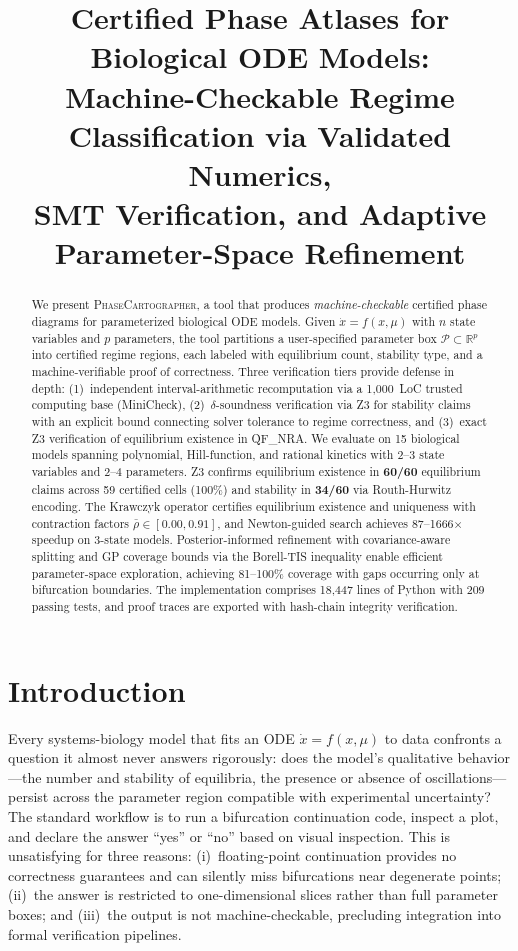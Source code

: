 \documentclass[11pt]{article}
\title{Certified Phase Atlases for Biological ODE Models:\\
Machine-Checkable Regime Classification via Validated Numerics,\\
SMT Verification, and Adaptive Parameter-Space Refinement}
\date{}
\newcommand{\R}{\mathbb{R}}
\newcommand{\PC}{\textsc{PhaseCartographer}}
\begin{document}
\maketitle

\begin{abstract}
We present \PC{}, a tool that produces \emph{machine-checkable} certified phase diagrams for parameterized biological ODE models.
Given $\dot{x} = f(x, \mu)$ with $n$ state variables and $p$ parameters, the tool partitions a user-specified parameter box $\mathcal{P} \subset \R^p$ into certified regime regions, each labeled with equilibrium count, stability type, and a machine-verifiable proof of correctness.
Three verification tiers provide defense in depth: (1)~independent interval-arithmetic recomputation via a 1{,}000~LoC trusted computing base (MiniCheck), (2)~$\delta$-soundness verification via Z3 for stability claims with an explicit bound connecting solver tolerance to regime correctness, and (3)~exact Z3 verification of equilibrium existence in QF\_NRA.
We evaluate on 15 biological models spanning polynomial, Hill-function, and rational kinetics with 2--3 state variables and 2--4 parameters.
Z3 confirms equilibrium existence in \textbf{60/60} equilibrium claims across 59 certified cells (100\%) and stability in \textbf{34/60} via Routh-Hurwitz encoding.
The Krawczyk operator certifies equilibrium existence and uniqueness with contraction factors $\bar\rho \in [0.00, 0.91]$, and Newton-guided search achieves 87--1666$\times$ speedup on 3-state models.
Posterior-informed refinement with covariance-aware splitting and GP coverage bounds via the Borell-TIS inequality enable efficient parameter-space exploration, achieving 81--100\% coverage with gaps occurring only at bifurcation boundaries.
The implementation comprises 18{,}447 lines of Python with 209 passing tests, and proof traces are exported with hash-chain integrity verification.
\end{abstract}

\section{Introduction}
\label{sec:intro}

Every systems-biology model that fits an ODE $\dot{x} = f(x, \mu)$ to data confronts a question it almost never answers rigorously: does the model's qualitative behavior---the number and stability of equilibria, the presence or absence of oscillations---persist across the parameter region compatible with experimental uncertainty?
The standard workflow is to run a bifurcation continuation code, inspect a plot, and declare the answer ``yes'' or ``no'' based on visual inspection.
This is unsatisfying for three reasons: (i)~floating-point continuation provides no correctness guarantees and can silently miss bifurcations near degenerate points; (ii)~the answer is restricted to one-dimensional slices rather than full parameter boxes; and (iii)~the output is not machine-checkable, precluding integration into formal verification pipelines.
\end{document}
